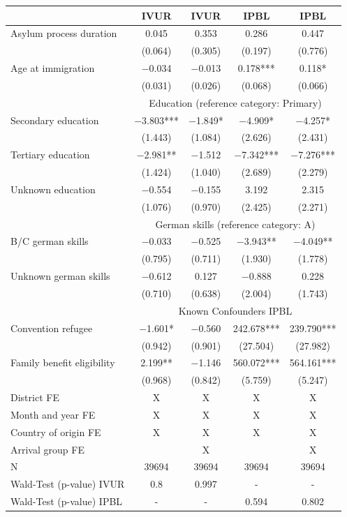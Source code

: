 
\centering
\begin{tabular}[t]{lcccc}
\toprule
  & IVUR & IVUR  & IPBL & IPBL \\
\midrule
Asylum process duration & \num{0.045} & \num{0.353} & \num{0.286} & \num{0.447}\\
 & (\num{0.064}) & (\num{0.305}) & (\num{0.197}) & (\num{0.776})\\
Age at immigration & \num{-0.034} & \num{-0.013} & \num{0.178}*** & \num{0.118}*\\
 & (\num{0.031}) & (\num{0.026}) & (\num{0.068}) & (\num{0.066})\\\midrule
& \multicolumn{4}{c}{Education (reference category: Primary)}\\Secondary education & \num{-3.803}*** & \num{-1.849}* & \num{-4.909}* & \num{-4.257}*\\
 & (\num{1.443}) & (\num{1.084}) & (\num{2.626}) & (\num{2.431})\\
Tertiary education & \num{-2.981}** & \num{-1.512} & \num{-7.342}*** & \num{-7.276}***\\
 & (\num{1.424}) & (\num{1.040}) & (\num{2.689}) & (\num{2.279})\\
Unknown education & \num{-0.554} & \num{-0.155} & \num{3.192} & \num{2.315}\\
 & (\num{1.076}) & (\num{0.970}) & (\num{2.425}) & (\num{2.271})\\
\midrule
& \multicolumn{4}{c}{German skills (reference category: A)}\\B/C german skills & \num{-0.033} & \num{-0.525} & \num{-3.943}** & \num{-4.049}**\\
 & (\num{0.795}) & (\num{0.711}) & (\num{1.930}) & (\num{1.778})\\
Unknown german skills & \num{-0.612} & \num{0.127} & \num{-0.888} & \num{0.228}\\
 & (\num{0.710}) & (\num{0.638}) & (\num{2.004}) & (\num{1.743})\\
\midrule
& \multicolumn{4}{c}{Known Confounders IPBL}\\Convention refugee & \num{-1.601}* & \num{-0.560} & \num{242.678}*** & \num{239.790}***\\
 & (\num{0.942}) & (\num{0.901}) & (\num{27.504}) & (\num{27.982})\\
Family benefit eligibility & \num{2.199}** & \num{-1.146} & \num{560.072}*** & \num{564.161}***\\
 & (\num{0.968}) & (\num{0.842}) & (\num{5.759}) & (\num{5.247})\\
\midrule
District FE & X & X & X & X\\
Month and year FE & X & X & X & X\\
Country of origin FE & X & X & X & X\\
Arrival group FE &  & X &  & X\\
\midrule
N & \num{39694} & \num{39694} & \num{39694} & \num{39694}\\
\midrule
Wald-Test (p-value) IVUR & 0.8 & 0.997 & - & -\\
Wald-Test (p-value) IPBL & - & - & 0.594 & 0.802\\
\bottomrule
\end{tabular}

